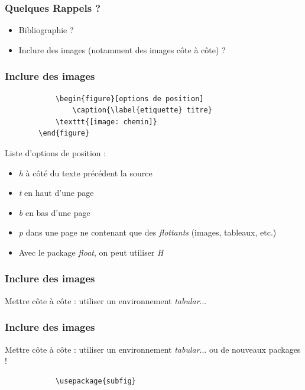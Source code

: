 \documentclass[handout]{beamer}
\begin{document}
	\begin{frame}
		\frametitle{Quelques Rappels ?}
		\begin{itemize}
			\item Bibliographie ?
			\item Inclure des images (notamment des images côte à côte) ?
		\end{itemize}
	\end{frame}

	\begin{frame}[fragile=singleslide]
		\frametitle{Inclure des images}

		\centering
		\begin{verbatim}
			\begin{figure}[options de position]
				\caption{\label{etiquette} titre}
			\texttt{[image: chemin]}
		\end{figure}
		\end{verbatim}

		Liste d'options de position :
		\begin{itemize}
			\item \textit{h} à côté du texte précédent la source
			\item \textit{t} en haut d'une page
			\item \textit{b} en bas d'une page
			\item \textit{p} dans une page ne contenant que des \emph{flottants} (images, tableaux, etc.)
			\item Avec le package \textit{float}, on peut utiliser \textit{H}
		\end{itemize}

	\end{frame}

	\begin{frame}
		\frametitle{Inclure des images}

		\centering
		Mettre côte à côte : utiliser un environnement \textit{tabular}...
	\end{frame}

	\begin{frame}[fragile=singleslide]
		\frametitle{Inclure des images}

		\centering
		Mettre côte à côte : utiliser un environnement \textit{tabular}... ou de nouveaux packages !\\

		\begin{verbatim}
			\usepackage{subfig}
		\end{verbatim}

	\end{frame}
\end{document}
